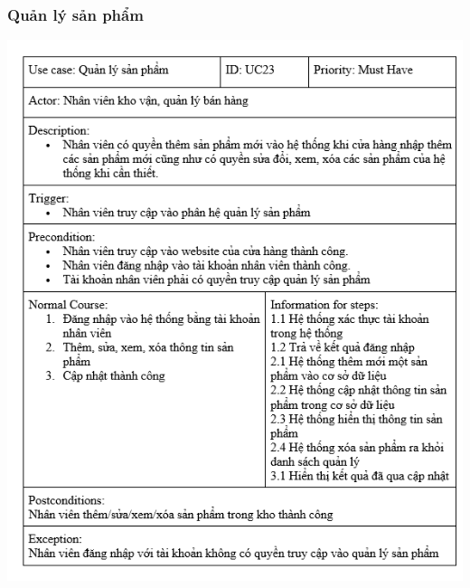 \documentclass[12pt,a4paper,2sides]{report}
\begin{document}
\subsubsection{Quản lý sản phẩm}
    \includegraphics[width=1\linewidth]{lib/usecase/quanlysp.png}\\\vspace*{1cm}    
\end{document}
